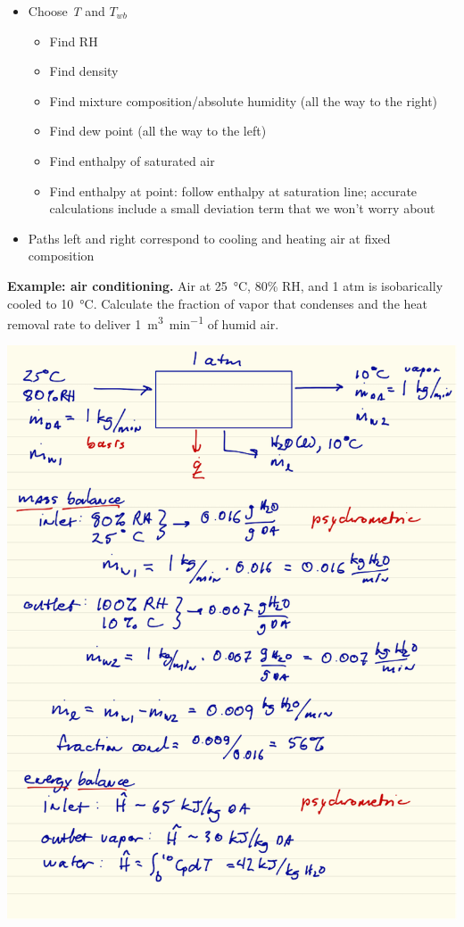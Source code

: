 \documentclass[11pt]{article}
\begin{document}
\begin{itemize}
\item Choose \emph{T} and \(T_{wb}\)
\begin{itemize}
\item Find RH
\item Find density
\item Find mixture composition/absolute humidity (all the way to the right)
\item Find dew point (all the way to the left)
\item Find enthalpy of saturated air
\item Find enthalpy at point: follow enthalpy at saturation line; accurate calculations include a small deviation term that we won't worry about
\end{itemize}
\item Paths left and right correspond to cooling and heating air at fixed composition
\end{itemize}

\begin{framed}
\noindent \textbf{Example: air conditioning.} Air at \SI{25}{\celsius}, 80\% RH, and 1 atm is isobarically cooled to \SI{10}{\celsius}.  Calculate the fraction of  vapor that condenses and the heat removal rate to deliver \SI{1}{\meter\cubed\per\minute} of humid air.
\end{framed}

\includegraphics[width=.9\linewidth]{./figs/AC1.png}
\end{document}
